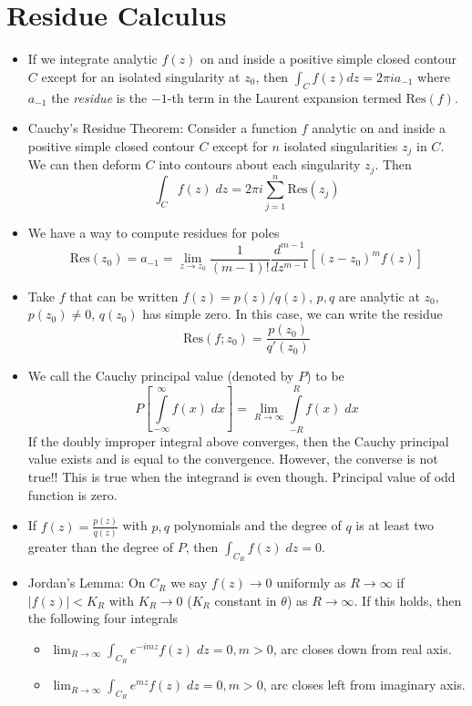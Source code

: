 \documentclass[10pt]{report}
\newcommand{\abs}[1]{\left|#1\right|}
\newcommand{\Res}[0]{\mathrm{Res} }
\begin{document}
\section{Residue Calculus}
\begin{itemize}
    \item If we integrate analytic $f(z)$ on and inside a positive simple closed contour $C$ except for an isolated singularity at $z_0$, then $\int_{C} f(z) dz = 2\pi i a_{-1}$ where $a_{-1}$ the \emph{residue} is the $-1$-th term in the Laurent expansion termed $\mathrm{Res}(f)$.
    \item Cauchy's Residue Theorem: Consider a function $f$ analytic on and inside a positive simple closed contour $C$ except for $n$ isolated singularities $z_j$ in $C$. We can then deform $C$ into contours about each singularity $z_j$. Then
        $$\int_C f(z)\; dz = 2\pi i\sum_{j=1}^n \mathrm{Res}(z_j)$$
    \item We have a way to compute residues for poles
        $$\Res(z_0) = a_{-1} = \lim_{z \to z_0}\frac{1}{(m-1)!} \frac{d^{m-1}}{dz^{m-1}}\left[ (z-z_0)^mf(z) \right]$$
    \item Take $f$ that can be written $f(z) = p(z)/q(z)$, $p,q$ are analytic at $z_0$, $p(z_0) \neq 0$, $q(z_0)$ has simple zero. In this case, we can write the residue
        $$\Res(f;z_0) = \frac{p(z_0)}{q'(z_0)}$$
    \item We call the Cauchy principal value (denoted by $P$) to be
        $$P\left[ \displaystyle\int\limits_{-\infty}^{\infty}f(x)\;dx \right] = \lim_{R \to \infty} \displaystyle\int\limits_{-R}^{R}f(x)\;dx$$
        If the doubly improper integral above converges, then the Cauchy principal value exists and is equal to the convergence. However, the converse is not true!! This is true when the integrand is even though. Principal value of odd function is zero.
    \item If $f(z) = \frac{p(z)}{q(z)}$ with $p,q$ polynomials and the degree of $q$ is at least two greater than the degree of $P$, then $\int_{C_R}f(z) \; dz = 0$.
    \item Jordan's Lemma: On $C_R$ we say $f(z) \to 0$ uniformly as $R \to \infty$ if $\abs{f(z)} < K_R$ with $K_R \to 0$ ($K_R$ constant in $\theta$) as $R \to \infty$. If this holds, then the following four integrals
        \begin{itemize}
            \item $\lim_{R \to \infty}\int_{C_R}e^{-imz}f(z) \; dz = 0, m > 0$, arc closes down from real axis.
            \item $\lim_{R \to \infty} \int_{C_R}e^{mz}f(z) \; dz = 0, m > 0$, arc closes left from imaginary axis.

\end{itemize}
\end{itemize}
\end{document}
